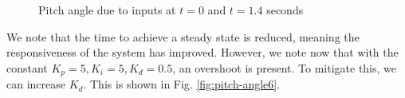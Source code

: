 \documentclass[12pt]{article}
\begin{document}
\begin{figure}[H]
\begin{subfigure}{.4\textwidth}
    \end{subfigure}
    \caption{Pitch angle due to inputs at $t = 0$ and $t = 1.4$ seconds}
    \label{fig:pitch-angle5}
\end{figure}

We note that the time to achieve a steady state is reduced, meaning the responsiveness of the system has improved. However, we note now that with the constant $K_p = 5, K_i = 5, K_d=0.5$, an overshoot is present. To mitigate this, we can increase $K_d$. This is shown in Fig. \ref{fig:pitch-angle6}.
\end{document}
